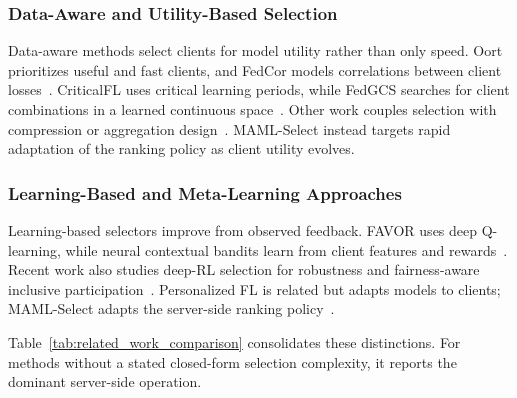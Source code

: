 \documentclass[journal]{IEEEtran}
\newcommand{\revision}[1]{#1}
\begin{document}
\subsubsection{Data-Aware and Utility-Based Selection}
Data-aware methods select clients for model utility rather than only speed. Oort prioritizes useful and fast clients, and FedCor models correlations between client losses~\cite{lai2021oort,tang2022fedcor}. CriticalFL uses critical learning periods, while FedGCS searches for client combinations in a learned continuous space~\cite{yan2023criticalfl,ning2024fedgcs}. Other work couples selection with compression or aggregation design~\cite{xu2024federated,tran2026fedimp}. MAML-Select instead targets rapid adaptation of the ranking policy as client utility evolves.

\subsubsection{Learning-Based and Meta-Learning Approaches}
Learning-based selectors improve from observed feedback. FAVOR uses deep Q-learning, while neural contextual bandits learn from client features and rewards~\cite{wang2020optimizing,pan2024contextual}. Recent work also studies deep-RL selection for robustness and fairness-aware inclusive participation~\cite{kazemi2026robust,arisdakessian2026vox}. Personalized FL is related but adapts models to clients; MAML-Select adapts the server-side ranking policy~\cite{fallah2020personalized}.

\revision{Table~\ref{tab:related_work_comparison} consolidates these distinctions. For methods without a stated closed-form selection complexity, it reports the dominant server-side operation.}
\end{document}
